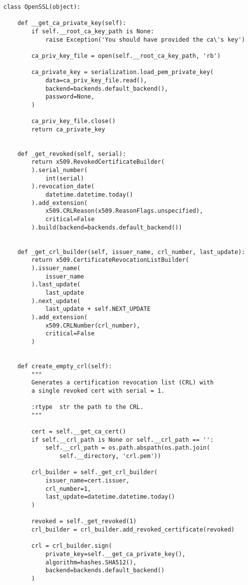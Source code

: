 \begin{verbatim}
class OpenSSL(object):

    def __get_ca_private_key(self):
        if self.__root_ca_key_path is None:
            raise Exception('You should have provided the ca\'s key')

        ca_priv_key_file = open(self.__root_ca_key_path, 'rb')

        ca_private_key = serialization.load_pem_private_key(
            data=ca_priv_key_file.read(),
            backend=backends.default_backend(),
            password=None,
        )

        ca_priv_key_file.close()
        return ca_private_key


    def _get_revoked(self, serial):
        return x509.RevokedCertificateBuilder(
        ).serial_number(
            int(serial)
        ).revocation_date(
            datetime.datetime.today()
        ).add_extension(
            x509.CRLReason(x509.ReasonFlags.unspecified),
            critical=False
        ).build(backend=backends.default_backend())


    def _get_crl_builder(self, issuer_name, crl_number, last_update):
        return x509.CertificateRevocationListBuilder(
        ).issuer_name(
            issuer_name
        ).last_update(
            last_update
        ).next_update(
            last_update + self.NEXT_UPDATE
        ).add_extension(
            x509.CRLNumber(crl_number),
            critical=False
        )    


    def create_empty_crl(self):
        """
        Generates a certification revocation list (CRL) with
        a single revoked cert with serial = 1.

        :rtype  str the path to the CRL.
        """

        cert = self.__get_ca_cert()
        if self.__crl_path is None or self.__crl_path == '':
            self.__crl_path = os.path.abspath(os.path.join(
                self.__directory, 'crl.pem'))

        crl_builder = self._get_crl_builder(
            issuer_name=cert.issuer,
            crl_number=1,
            last_update=datetime.datetime.today()
        )

        revoked = self._get_revoked(1)
        crl_builder = crl_builder.add_revoked_certificate(revoked)

        crl = crl_builder.sign(
            private_key=self.__get_ca_private_key(),
            algorithm=hashes.SHA512(),
            backend=backends.default_backend()
        )


\end{verbatim}
